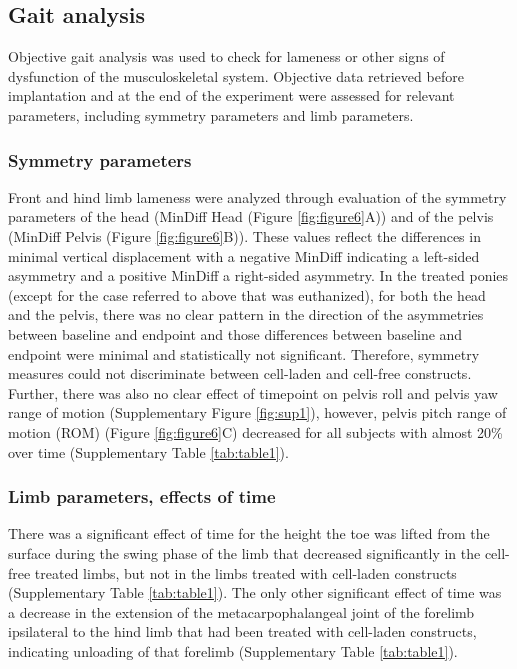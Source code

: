 \documentclass[twocolumn, serif, empirical, authordate, seplic]{jote-article}
\begin{document}
 {}\subsection*{Gait analysis} 

Objective gait analysis was used to check for lameness or other signs of dysfunction of the musculoskeletal system. Objective data retrieved before implantation and at the end of the experiment were assessed for relevant parameters, including symmetry parameters and limb parameters.

 {}\subsubsection*{Symmetry parameters} 

Front and hind limb lameness were analyzed through evaluation of the symmetry parameters of the head (MinDiff Head (Figure \ref{fig:figure6}A)) and of the pelvis (MinDiff Pelvis (Figure \ref{fig:figure6}B)). These values reflect the differences in minimal vertical displacement with a negative MinDiff indicating a left-sided asymmetry and a positive MinDiff a right-sided asymmetry. In the treated ponies (except for the case referred to above that was euthanized), for both the head and the pelvis, there was no clear pattern in the direction of the asymmetries between baseline and endpoint and those differences between baseline and endpoint were minimal and statistically not significant. Therefore, symmetry measures could not discriminate between cell-laden and cell-free constructs. Further, there was also no clear effect of timepoint on pelvis roll and pelvis yaw range of motion (Supplementary Figure \ref{fig:sup1}), however, pelvis pitch range of motion (ROM) (Figure \ref{fig:figure6}C) decreased for all subjects with almost 20\% over time (Supplementary Table \ref{tab:table1}).

 {}\subsubsection*{Limb parameters, effects of time} 

There was a significant effect of time for the height the toe was lifted from the surface during the swing phase of the limb that decreased significantly in the cell-free treated limbs, but not in the limbs treated with cell-laden constructs (Supplementary Table \ref{tab:table1}). The only other significant effect of time was a decrease in the extension of the metacarpophalangeal joint of the forelimb ipsilateral to the hind limb that had been treated with cell-laden constructs, indicating unloading of that forelimb (Supplementary Table \ref{tab:table1}).
\end{document}
